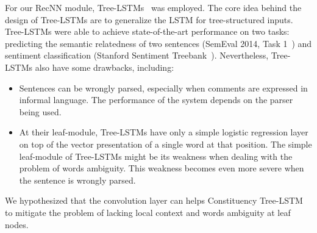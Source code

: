 For our RecNN module, Tree-LSTMs~\cite{treeLSTM} was employed.
The core idea behind the design of Tree-LSTMs are to generalize the LSTM for tree-structured inputs.
Tree-LSTMs were able to achieve state-of-the-art performance on two tasks: predicting the semantic relatedness of two sentences (SemEval 2014, Task 1~\cite{SemeEvalTask1}) and sentiment classification (Stanford Sentiment Treebank~\cite{socher2013recursive}).
Nevertheless, Tree-LSTMs also have some drawbacks, including:
\begin{itemize}
	\item Sentences can be wrongly parsed, especially when comments are expressed in informal language.
	The performance of the system depends on the parser being used.
	\item At their leaf-module, Tree-LSTMs have only a simple logistic regression layer on top of the vector presentation of a single word at that position.
	The simple leaf-module of Tree-LSTMs might be its weakness when dealing with the problem of words ambiguity.
	This weakness becomes even more severe when the sentence is wrongly parsed. 
\end{itemize}
We hypothesized that the convolution layer can helps Constituency Tree-LSTM to mitigate the problem of lacking local context and words ambiguity at leaf nodes.